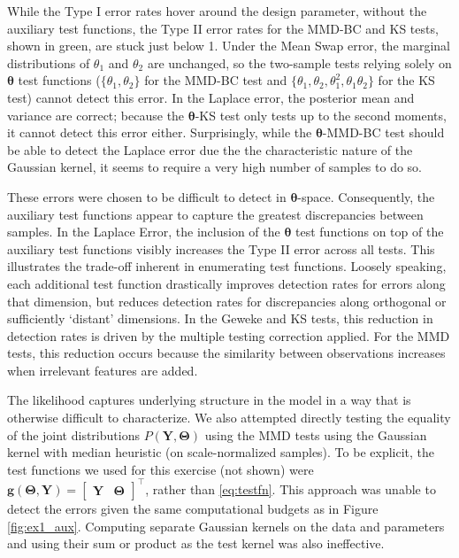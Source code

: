 \documentclass[a4paper,12pt]{article}
\begin{document}
While the Type I error rates hover around the design parameter, without the auxiliary test functions, the Type II error rates for the MMD-BC and KS tests, shown in green, are stuck just below 1. Under the Mean Swap error, the marginal distributions of $\theta_{1}$ and $\theta_{2}$ are unchanged, so the two-sample tests relying solely on $\mathbf{\theta}$ test functions ($\{\theta_{1}, \theta_{2}\}$ for the MMD-BC test and $\{\theta_{1}, \theta_{2}, \theta_{1}^{2}, \theta_{1}\theta_{2}\}$ for the KS test) cannot detect this error. In the Laplace error, the posterior mean and variance are correct; because the $\mathbf{\theta}$-KS test only tests up to the second moments, it cannot detect this error either. Surprisingly, while the $\mathbf{\theta}$-MMD-BC test should be able to detect the Laplace error due the the characteristic nature of the Gaussian kernel, it seems to require a very high number of samples to do so.

These errors were chosen to be difficult to detect in $\mathbf{\theta}$-space. Consequently, the auxiliary test functions appear to capture the greatest discrepancies between samples. In the Laplace Error, the inclusion of the $\mathbf{\theta}$ test functions on top of the auxiliary test functions visibly increases the Type II error across all tests. This illustrates the trade-off inherent in enumerating test functions. Loosely speaking, each additional test function drastically improves detection rates for errors along that dimension, but reduces detection rates for discrepancies along orthogonal or sufficiently `distant' dimensions. In the Geweke and KS tests, this reduction in detection rates is driven by the multiple testing correction applied. For the MMD tests, this reduction occurs because the similarity between observations increases when irrelevant features are added.

The likelihood captures underlying structure in the model in a way that is otherwise difficult to characterize. We also attempted directly testing the equality of the joint distributions $P(\mathbf{Y}, \mathbf{\Theta})$ using the MMD tests using the Gaussian kernel with median heuristic (on scale-normalized samples). To be explicit, the test functions we used for this exercise (not shown) were $\mathbf{g}(\mathbf{\Theta}, \mathbf{Y}) = \begin{bmatrix}  \mathbf{Y}& \mathbf{\Theta} \end{bmatrix}^{\top}$, rather than \eqref{eq:testfn}. This approach was unable to detect the errors given the same computational budgets as in Figure \ref{fig:ex1_aux}. Computing separate Gaussian kernels on the data and parameters and using their sum or product as the test kernel was also ineffective.
\end{document}
